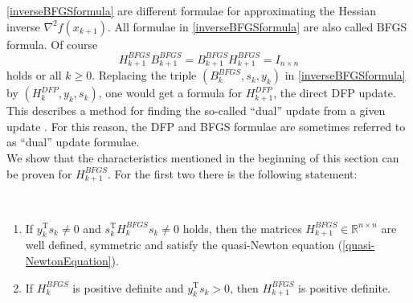 \cref{inverseBFGSformula} are different formulae for approximating the Hessian inverse $\nabla^2 f(x_{k+1})$. All formulae in \cref{inverseBFGSformula} are also called BFGS formula. Of course
\begin{equation*}
    H^{BFGS}_{k+1} B^{BFGS}_{k+1} = B^{BFGS}_{k+1} H^{BFGS}_{k+1} = I_{n \times n}
\end{equation*}
holds or all $k \geq 0$. Replacing the triple $(B^{BFGS}_k, s_k, y_k)$ in \cref{inverseBFGSformula} by $(H^{DFP}_k, y_k, s_k)$, one would get a formula for $H^{DFP}_{k+1}$, the direct DFP update. This describes a method for finding the so-called “dual” update from a given update \cite[p.218]{SunYuan:2006}. For this reason, the DFP and BFGS formulae are sometimes referred to as “dual” update formulae. \\
We show that the characteristics mentioned in the beginning of this section can be proven for $H^{BFGS}_{k+1}$. For the first two there is the following statement:

\begin{theorem}\label{thmUlbrichUlbrich13.4} \ \\[-1.5\baselineskip]
    \begin{enumerate}
        \item If $y_k^{\mathrm{T}} s_k \neq 0$ and $s_k^{\mathrm{T}} H^{BFGS}_k s_k \neq 0$ holds, then the matrices $H^{BFGS}_{k+1} \in \mathbb{R}^{n \times n}$ are well defined, symmetric and satisfy the quasi-Newton equation (\cref{quasi-NewtonEquation}).
        \item If $H^{BFGS}_k$ is positive definite and $y_k^{\mathrm{T}} s_k > 0$, then $H^{BFGS}_{k+1}$ is positive definite.
    \end{enumerate}
\end{theorem} 

